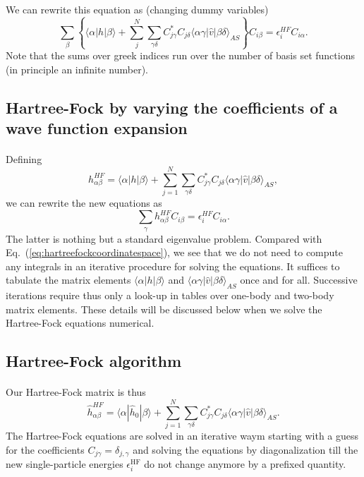 \documentclass[%
twoside,                 %
final,                   %
10pt]{article}
\begin{document}
\paragraph{}
We can rewrite this equation as (changing dummy variables)
\[
\sum_{\beta} \left\{\langle \alpha | h | \beta \rangle+
\sum_{j}^N\sum_{\gamma\delta} C^*_{j\gamma}C_{j\delta}\langle \alpha\gamma|\hat{v}|\beta\delta\rangle_{AS}\right\}C_{i\beta}=\epsilon_i^{HF}C_{i\alpha}.
\]
Note that the sums over greek indices run over the number of basis set functions (in principle an infinite number).



\subsection*{Hartree-Fock by varying the coefficients of a wave function expansion}

\paragraph{}
Defining 
\[
h_{\alpha\beta}^{HF}=\langle \alpha | h | \beta \rangle+
\sum_{j=1}^N\sum_{\gamma\delta} C^*_{j\gamma}C_{j\delta}\langle \alpha\gamma|\hat{v}|\beta\delta\rangle_{AS},
\]
we can rewrite the new equations as 
\begin{equation}
\sum_{\gamma}h_{\alpha\beta}^{HF}C_{i\beta}=\epsilon_i^{HF}C_{i\alpha}. \label{eq:newhf}
\end{equation}
The latter is nothing but a standard eigenvalue problem. Compared with Eq.~(\ref{eq:hartreefockcoordinatespace}),
we see that we do not need to compute any integrals in an iterative procedure for solving the equations.
It suffices to tabulate the matrix elements $\langle \alpha | h | \beta \rangle$ and $\langle \alpha\gamma|\hat{v}|\beta\delta\rangle_{AS}$ once and for all. Successive iterations require thus only a look-up in tables over one-body and two-body matrix elements. These details will be discussed below when we solve the Hartree-Fock equations numerical.



\subsection*{Hartree-Fock algorithm}

\paragraph{}
Our Hartree-Fock matrix  is thus
\[
\hat{h}_{\alpha\beta}^{HF}=\langle \alpha | \hat{h}_0 | \beta \rangle+
\sum_{j=1}^N\sum_{\gamma\delta} C^*_{j\gamma}C_{j\delta}\langle \alpha\gamma|\hat{v}|\beta\delta\rangle_{AS}.
\]
The Hartree-Fock equations are solved in an iterative waym starting with a guess for the coefficients $C_{j\gamma}=\delta_{j,\gamma}$ and solving the equations by diagonalization till the new single-particle energies
$\epsilon_i^{\mathrm{HF}}$ do not change anymore by a prefixed quantity.
\end{document}
